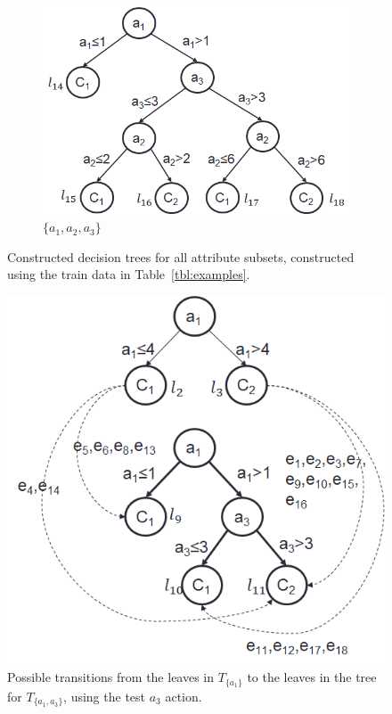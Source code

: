\documentclass[letterpaper]{article}
\theoremstyle{definition}
\begin{document}
\begin{figure}[!t]
    \hspace{-20mm}
	\begin{subfigure}[t]{1in}\vskip 0pt
		\centering
		\caption{$\{a_1,a_2,a_3\}$}\label{fig:a1a2a3}
		\includegraphics[scale=0.3]{a1a2a3}
	\end{subfigure}
	\caption{Constructed decision trees for all attribute subsets, constructed using the train data in Table~\ref{tbl:examples}.}\label{fig:Trees}
\end{figure}


\begin{figure}[ht]
\centering
\includegraphics[scale=0.5]{Transition2}
\caption{Possible transitions from the leaves in $T_{\{a_1\}}$ to the leaves in the tree for $T_{\{a_1,a_3\}}$, using the test $a_3$ action.}
\label{fig:transition}
\end{figure}
\end{document}
